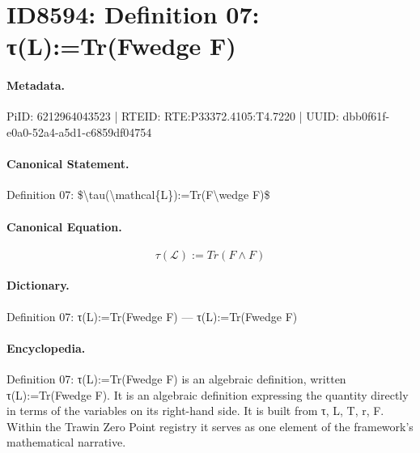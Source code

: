 \section*{ID8594: Definition 07: τ(L):=Tr(Fwedge F)}
\paragraph{Metadata.}
PiID: 6212964043523 | RTEID: RTE:P33372.4105:T4.7220 | UUID: dbb0f61f-e0a0-52a4-a5d1-c6859df04754

\paragraph{Canonical Statement.}
Definition 07: \$\textbackslash{}tau(\textbackslash{}mathcal\{L\}):=Tr(F\textbackslash{}wedge F)\$

\paragraph{Canonical Equation.}
\[
\tau(\mathcal{L}):=Tr(F\wedge F)
\]

\paragraph{Dictionary.}
Definition 07: τ(L):=Tr(Fwedge F) — τ(L):=Tr(Fwedge F)

\paragraph{Encyclopedia.}
Definition 07: τ(L):=Tr(Fwedge F) is an algebraic definition, written τ(L):=Tr(Fwedge F). It is an algebraic definition expressing the quantity directly in terms of the variables on its right-hand side. It is built from τ, L, T, r, F. Within the Trawin Zero Point registry it serves as one element of the framework's mathematical narrative.
